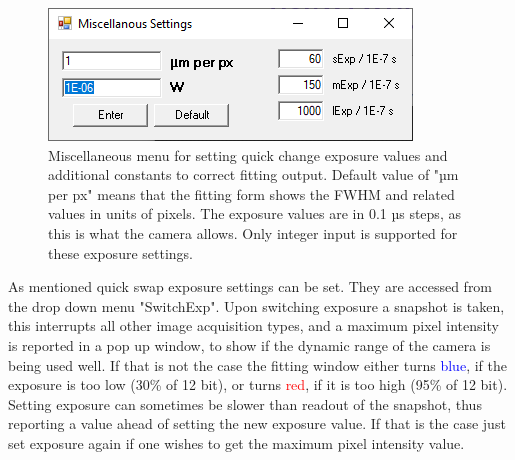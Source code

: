 \documentclass[twoside,openright,listof=numbered]{scrreprt}
\begin{document}
\begin{figure}[hbtp]
\centering
\includegraphics[scale=1]{images/ArtrayExamplePics/DefaultMiscSettings.PNG}
\caption[Miscellaneous menu for setting quick change exposure values and additional constants to correct fitting output.]{Miscellaneous menu for setting quick change exposure values and additional constants to correct fitting output. 
Default value of "µm per px" means that the fitting form shows the FWHM and related values in units of pixels. The exposure values are in 0.1 µs steps, as this is what the camera allows. Only integer input is supported for these exposure settings.\label{LiveFitting:MiscMenu}}
\end{figure}



As mentioned quick swap exposure settings can be set. They are accessed from the drop down menu "SwitchExp". Upon switching exposure a snapshot is taken, this interrupts all other image acquisition types, and a maximum pixel intensity is reported in a pop up window, to show if the dynamic range of the camera is being used well. If that is not the case the fitting window either turns \textcolor{blue}{blue}, if the exposure is too low (30\% of 12 bit), or turns \textcolor{red}{red}, if it is too high (95\% of 12 bit). Setting exposure can sometimes be slower than readout of the snapshot, thus reporting a value ahead of setting the new exposure value. If that is the case just set exposure again if one wishes to get the maximum pixel intensity value.\\
\end{document}
